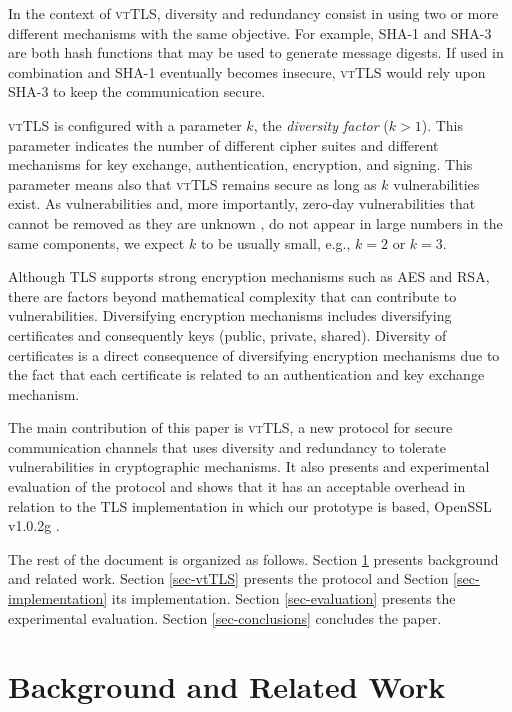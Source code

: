 \documentclass{sig-alternate-05-2015}
\begin{document}
In the context of \textsc{vtTLS}, diversity and redundancy consist in using two or more different mechanisms with the same objective. For example, SHA-1 and SHA-3 are both hash functions that may be used to generate message digests. If used in combination and  SHA-1 eventually becomes insecure, \textsc{vtTLS} would rely upon SHA-3 to keep the communication secure. %

\textsc{vtTLS} is configured with a parameter $k$, the \emph{diversity factor} ($k>1$). This parameter indicates the number of different cipher suites and different mechanisms for key exchange, authentication, encryption, and signing. This parameter means also that \textsc{vtTLS} remains secure as long as $k$ vulnerabilities exist. As vulnerabilities and, more importantly, zero-day vulnerabilities that cannot be removed as they are unknown \cite{Bilge:12}, do not appear in large numbers in the same components, we expect $k$ to be usually small, e.g., $k=2$ or $k=3$. 

Although TLS supports strong encryption mechanisms such as AES and RSA, there are factors beyond mathematical complexity that can contribute to vulnerabilities.
Diversifying encryption mechanisms includes diversifying certificates and consequently keys (public, private, shared).
Diversity of certificates is a direct consequence of diversifying encryption mechanisms due to the fact that each certificate is related to an authentication and key exchange mechanism.

The main contribution of this paper is \textsc{vtTLS}, a new protocol for secure communication channels that uses diversity and redundancy to tolerate vulnerabilities in cryptographic mechanisms. It also presents and experimental evaluation of the protocol and shows that it has an acceptable overhead in relation to the TLS implementation in which our prototype is based, OpenSSL v1.0.2g \cite{viega2002network}.

The rest of the document is organized as follows. Section \ref{sec-related-work} presents background and related work. Section \ref{sec-vtTLS} presents the protocol and Section \ref{sec-implementation} its implementation. Section \ref{sec-evaluation} presents the experimental evaluation. Section \ref{sec-conclusions} concludes the paper.


\section{Background and Related Work}
\label{sec-related-work}
\end{document}
